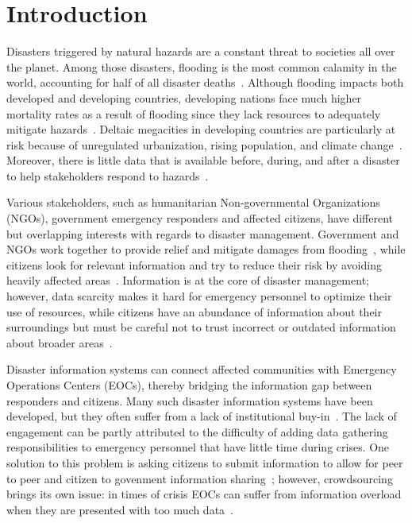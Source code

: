 \chapter{Introduction} Disasters triggered by natural hazards are a constant
threat to societies all over the planet. Among those disasters, flooding is the
most common calamity in the world, accounting for half of all disaster
deaths~\cite{chanFloodRiskAsia2012, ohlFloodingHumanHealth2000}.
Although flooding impacts both developed and developing countries, developing
nations face much higher mortality rates as a result of flooding since they lack
resources to adequately mitigate
hazards~\cite{quarantelliUrbanVulnerabilityDisasters2003,
ahernGlobalHealthImpacts2005}. Deltaic megacities in developing countries are
particularly at risk because of unregulated urbanization, rising population, and
climate change~\cite{chanFloodRiskAsia2012}.  Moreover, there is little data
that is available before, during, and after a disaster to help stakeholders
respond to hazards~\cite{meierDigitalHumanitariansHow2015}.

Various stakeholders, such as humanitarian Non-governmental Organizations (NGOs),
government emergency responders and affected citizens, have different but
overlapping interests with regards to disaster management.  Government and NGOs
work together to provide relief and mitigate damages from
flooding~\cite{chanResilientFloodRisk2018}, while citizens
look for relevant information and try to reduce their
risk by avoiding heavily affected
areas~\cite{viewegMicrobloggingTwoNatural2010}. Information is at the core of
disaster management; however, data scarcity makes it hard for emergency
personnel to optimize their use of resources, while citizens have an abundance
of information about their surroundings but must be careful not to trust
incorrect or outdated information about broader
areas~\cite{quarantelliProblematicalAspectsInformation1997}.

Disaster information systems can connect affected communities with
Emergency Operations Centers (EOCs), thereby bridging the information gap
between responders and citizens. Many such disaster information systems have
been developed, but they often suffer from a lack of institutional
buy-in~\cite{aminDataNaturalDisasters2008}. The lack of engagement can be partly
attributed to the difficulty of adding data gathering responsibilities to
emergency personnel that have little time during crises. One solution to this
problem is asking citizens to submit information to allow for peer to peer and
citizen to govenment information
sharing~\cite{meierDigitalHumanitariansHow2015}; however, crowdsourcing brings
its own issue: in times of crisis EOCs can suffer from information overload when
they are presented with too much
data~\cite{tierneyFacingUnexpectedDisaster2001}. 

